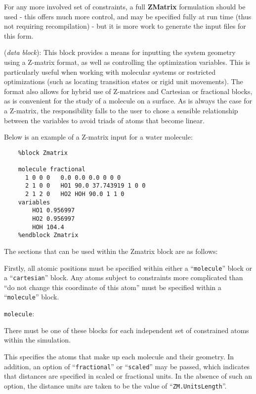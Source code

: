 \documentclass[11pt]{article}
\begin{document}
For any more involved set of constraints, a 
full \textbf{ZMatrix} formulation should be used - this
offers much more control, and may be specified fully at
run time (thus not requiring recompilation) - but
it is more work to generate the input files for this form.


\begin{description}
\itemsep 10pt
\parsep 0pt

\item[{\bf Zmatrix}] ({\it data block}): 
This block provides a means for inputting the system geometry using a Z-matrix
format, as well as controlling the optimization variables. This is particularly
useful when working with molecular systems or restricted optimizations (such
as locating transition states or rigid unit movements). The format also
allows for hybrid use of Z-matrices and Cartesian or fractional blocks, as
is convenient for the study of a molecule on a surface.
As is always the case for a Z-matrix, the responsibility falls to the user to
chose a sensible relationship between the variables to avoid triads of atoms
that become linear. 

Below is an example of a Z-matrix input for a water molecule:
\begin{verbatim}
    %block Zmatrix

    molecule fractional
      1 0 0 0   0.0 0.0 0.0 0 0 0
      2 1 0 0   HO1 90.0 37.743919 1 0 0
      2 1 2 0   HO2 HOH 90.0 1 1 0
    variables
        HO1 0.956997
        HO2 0.956997
        HOH 104.4
    %endblock Zmatrix
\end{verbatim}

The sections that can be used within the Zmatrix block are as follows:

Firstly, all atomic positions must be specified within either a 
``\texttt{molecule}'' block or a ``\texttt{cartesian}'' block. 
Any atoms subject to
constraints more complicated than ``do not change this coordinate
of this atom'' must be specified within a ``\texttt{molecule}'' block.

\item \texttt{molecule}: 

There must be one of these blocks for each independent set of
constrained atoms within the simulation.

This specifies the atoms that make up each molecule and their
geometry. In addition, an option of ``\texttt{fractional}'' or ``\texttt{scaled}''
may be passed, which indicates that distances are specified
in scaled or fractional units. In the absence of such an option, the 
distance units are taken to be the value of ``\texttt{ZM.UnitsLength}''.
 

\end{description}
\end{document}
